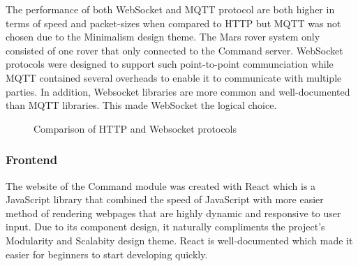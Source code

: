 \documentclass[11pt, a4paper]{article}
\begin{document}
The performance of both WebSocket and MQTT protocol are both higher in terms of speed and packet-sizes when compared to HTTP but MQTT was not chosen due to the Minimalism design theme. The Mars rover system only consisted of one rover that only connected to the Command server. WebSocket protocols were designed to support such point-to-point communciation while MQTT contained several overheads to enable it to communicate with multiple parties. In addition, Websocket libraries are more common and well-documented than MQTT libraries. This made WebSocket the logical choice.
\begin{figure}[!h]
    \centering
    \hfill
    \caption{Comparison of HTTP and Websocket protocols \cite{SocketvsHTTP}}
\end{figure}

\subsubsection{Frontend}

The website of the Command module was created with React which is a JavaScript library that combined the speed of JavaScript with more easier method of rendering webpages that are highly dynamic and responsive to user input. Due to its component design, it naturally compliments the project's Modularity and Scalabity design theme. React is well-documented which made it easier for beginners to start developing quickly.    
\end{document}
